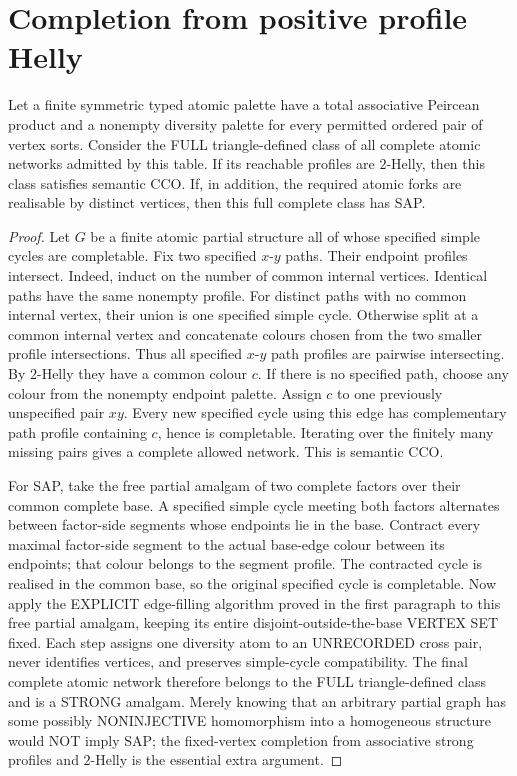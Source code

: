 \section{Completion from positive profile Helly}\label{sec:profile-helly-completion}

\begin{lemma}\label{lem:helly-to-cco}
Let a finite symmetric typed atomic palette have a total associative Peircean
product and a nonempty diversity palette for every permitted ordered
pair of vertex sorts. Consider the FULL triangle-defined class of all complete atomic
networks admitted by this table. If its reachable profiles are
\(2\)-Helly, then this class satisfies semantic CCO. If, in
addition, the required atomic forks are realisable by distinct
vertices, then this full complete class has SAP.
\end{lemma}

\begin{proof}
Let \(G\) be a finite atomic partial structure all of whose specified simple
cycles are completable.  Fix two specified \(x\)-\(y\) paths.  Their endpoint
profiles intersect.  Indeed, induct on the number of common internal vertices.
Identical paths have the same nonempty profile. For distinct paths
with no common internal vertex, their union is one specified simple cycle.  Otherwise split
at a common internal vertex and concatenate colours chosen from the two smaller
profile intersections.  Thus all specified \(x\)-\(y\) path profiles are
pairwise intersecting.  By \(2\)-Helly they have a common colour \(c\). If there is no
specified path, choose any colour from the nonempty endpoint palette.
Assign \(c\) to one previously unspecified pair \(xy\).  Every new specified
cycle using this edge has complementary path profile containing \(c\), hence is
completable.  Iterating over the finitely many missing pairs gives a complete
allowed network.  This is semantic CCO.

For SAP, take the free partial amalgam of two complete factors over their common
complete base.  A specified simple cycle meeting both factors alternates
between factor-side segments whose endpoints lie in the base.  Contract every
maximal factor-side segment to the actual base-edge colour between its
endpoints; that colour belongs to the segment profile.  The contracted cycle
is realised in the common base, so the original specified cycle is
completable. Now apply the EXPLICIT edge-filling algorithm proved
in the first paragraph to this free partial amalgam, keeping its
entire disjoint-outside-the-base VERTEX SET fixed. Each step assigns
one diversity atom to an UNRECORDED cross pair, never identifies
vertices, and preserves simple-cycle compatibility. The final
complete atomic network therefore belongs to the FULL
triangle-defined class and is a STRONG amalgam.
Merely knowing that an arbitrary partial graph has some possibly
NONINJECTIVE homomorphism into a homogeneous structure would
NOT imply SAP; the fixed-vertex completion from associative
strong profiles and $2$-Helly is the essential extra argument.
\end{proof}
